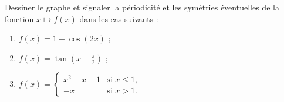 
\begin{exercice}[\coolexo]\label{exoTD1_2}

Dessiner le graphe et signaler la périodicité et les symétries éventuelles de la fonction $x\mapsto f(x)$ dans les cas suivants :
\begin{enumerate}
\item 
  $\displaystyle f(x)= 1 + \cos(2x)$ ;
  \item 
    $\displaystyle f(x)= \tan\left(x+\frac{\pi}{2}\right)$ ;
    \item
       $\displaystyle f(x)= \left\{
      \begin{array}{ll}
        x^2-x-1 & \textrm{si } x\leq 1,\\
        -x & \textrm{si } x>1.
      \end{array}
      \right.$ 
\end{enumerate}


  
\end{exercice}
